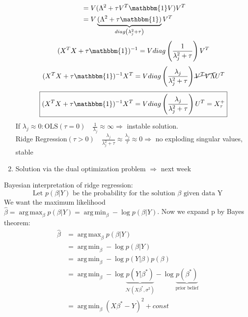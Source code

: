 \documentclass[11pt]{article}
\DeclareMathOperator*{\argmin}{arg\,min}
\DeclareMathOperator*{\argmax}{arg\,max}
\begin{document}
\begin{enumerate}
\begin{equation*}
\begin{align*}
        &= V(\Lambda^2+\tau V^T\mathbbm{1}V)V^T \\
        &= V\underbrace{(\Lambda^2+\tau\mathbbm{1})}_{diag\left( \lambda_j^2+\tau \right) }V^T
        \end{align*}
      \end{equation*}
      \begin{equation*}
        \begin{align*}
          (X^TX+\tau\mathbbm{1})^{-1}=V diag\left(\frac{1}{\lambda_j^2+\tau}\right) V^T
        \end{align*}
      \end{equation*}
      \begin{equation*}
        \begin{align*}
          (X^TX+\tau\mathbbm{1})^{-1}X^T=Vdiag\left(\frac{\lambda_j}{\lambda_j^2+\tau}\right) \cancel{V^TV\Lambda}U^T
        \end{align*}
      \end{equation*}
      \begin{equation*}
        \boxed{(X^TX+\tau\mathbbm{1})^{-1}X^T=Vdiag\left(\frac{\lambda_j}{\lambda_j^2+\tau}\right) U^T=X_\tau^+}
      \end{equation*}
    If $\lambda_j \approx 0: \text{OLS}(\tau=0) \quad \frac{1}{\lambda_j} \approx \infty \Rightarrow
    $ instable solution. \\
     Ridge Regression$(\tau>0) \quad \frac{\lambda_j}{\lambda_j^2+\tau} \approx
    \frac{\lambda_j}{\tau} \approx 0 \Rightarrow$ no exploding singular values, stable
    \item Solution via the dual optimization problem $\Rightarrow$ next week
    \end{enumerate}
    Bayesian interpretation of ridge regression:
    \begin{equation*}
      \text{Let } p(\beta|Y) \text{ be the probability for the solution $\beta$ given data Y}
    \end{equation*}
    We want the maximum likelihood $\hat{\beta}=\argmax_\beta p(\beta|Y)=\argmin_\beta
    -\log p(\beta|Y)$.
    Now we expand p by Bayes theorem:
    \begin{equation*}
      \begin{align*}
        \hat{\beta}&=\argmax_\beta p(\beta|Y) \\
        &=\argmin_\beta -\log p(\beta|Y) \\
        &=\argmin_\beta - \log p(Y|\beta)p(\beta) \\
        &=\argmin_\beta -\log \underbrace{p(Y|\beta^*)}_{
        \mathcal{N}(X\beta^*,\sigma^2)}-\log \underbrace{p(\beta^*)}_{\text{prior belief}} \\
        &= \argmin_\beta (X\beta^*-Y)^2 + const
      \end{align*}
    \end{equation*}
\end{document}
